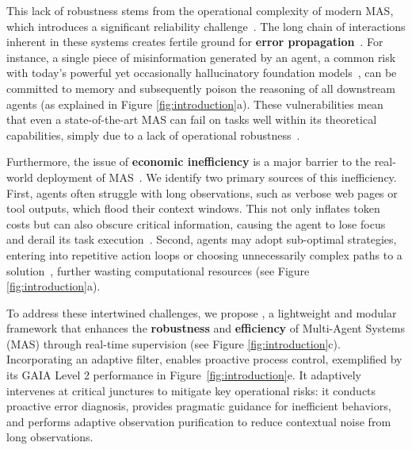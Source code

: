 This lack of robustness stems from the operational complexity of modern MAS, which introduces a significant reliability challenge~\citep{tian2025outlookopportunitieschallengesmultiagent}.
The long chain of interactions inherent in these systems creates fertile ground for \textbf{error propagation}~\citep{dong2025practicalmemoryinjectionattack,shen2025understandinginformationpropagationeffects}.
For instance, a single piece of misinformation generated by an agent, a common risk with today's powerful yet occasionally hallucinatory foundation models~\citep{kalai2025languagemodelshallucinate,farquhar_detecting_2024}, can be committed to memory and subsequently poison the reasoning of all downstream agents (as explained in Figure \ref{fig:introduction}a).
These vulnerabilities mean that even a state-of-the-art MAS can fail on tasks well within its theoretical capabilities, simply due to a lack of operational robustness~\citep{chen2024agentpoisonredteamingllmagents}.

Furthermore, the issue of \textbf{economic inefficiency} is a major barrier to the real-world deployment of MAS~\citep{wang2025efficientagentsbuildingeffective}.
We identify two primary sources of this inefficiency.
First, agents often struggle with long observations, such as verbose web pages or tool outputs, which flood their context windows.
This not only inflates token costs but can also obscure critical information, causing the agent to lose focus and derail its task execution~\citep{hosseini-etal-2025-efficient}.
Second, agents may adopt sub-optimal strategies, entering into repetitive action loops or choosing unnecessarily complex paths to a solution~\citep{cemri2025multiagentllmsystemsfail}, further wasting computational resources (see Figure \ref{fig:introduction}a).



To address these intertwined challenges, we propose \method, a lightweight and modular framework that enhances the \textbf{robustness} and \textbf{efficiency} of Multi-Agent Systems (MAS) through real-time supervision (see Figure \ref{fig:introduction}c).
Incorporating an adaptive filter, \method enables proactive process control, exemplified by its GAIA Level 2 performance in Figure~\ref{fig:introduction}e.
It adaptively intervenes at critical junctures to mitigate key operational risks: it conducts proactive error diagnosis, provides pragmatic guidance for inefficient behaviors, and performs adaptive observation purification to reduce contextual noise from long observations.


